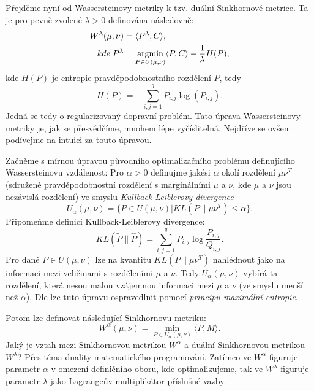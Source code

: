 \documentclass[czech]{article}
\begin{document}
Přejděme nyní od Wassersteinovy metriky k tzv. duální Sinkhornově metrice.
Ta je pro pevně zvolené $\lambda > 0$ definována následovně:
\begin{align}
    W^\lambda (\mu, \nu) &= \langle P^\lambda, C \rangle, \\
    kde \; P^\lambda &= \operatornamewithlimits{argmin}_{P \in U(\mu, \nu)} \langle P, C \rangle - \frac{1}{\lambda} H(P),
\end{align}
kde $H(P)$ je entropie pravděpodobnostního rozdělení $P$, tedy 
\begin{equation*}
    H(P) = - \sum_{i, j = 1}^q P_{i, j} \operatorname{log}(P_{i, j}).
\end{equation*}
Jedná se tedy o regularizovaný dopravní problém.
Tato úprava Wassersteinovy metriky je, jak se přesvědčíme, mnohem lépe vyčíslitelná.
Nejdříve se ovšem podívejme na intuici za touto úpravou.

Začněme s mírnou úpravou původního optimalizačního problému definujícího Wassersteinovu vzdálenost:
Pro $\alpha > 0$ definujme jakési $\alpha$ okolí rozdělení $\mu \nu^T$
(sdružené pravděpodobnostní rozdělení s marginálními $\mu$ a $\nu$, kde $\mu$ a $\nu$ jsou nezávislá rozdělení) ve smyslu
\emph{Kullback-Leiblerovy divergence}
\begin{equation}
    U_{\alpha} (\mu, \nu) = \{P \in U(\mu, \nu) | KL(P \| \mu \nu^T) \leq \alpha\}.
\end{equation}
Připomeňme definici Kullback-Leiblerovy divergence:
\begin{equation*}
    KL(\tilde{P} \| \hat{P}) = \sum_{i, j = 1}^q P_{i, j} \operatorname{log} \frac{P_{i, j}}{ Q_{i, j}}.
\end{equation*}
Pro dané $P \in U(\mu, \nu)$ lze na kvantitu $KL(P \| \mu \nu^T)$ nahlédnout jako na informaci mezi veličinami s rozděleními $\mu$ a $\nu$.
Tedy $U_\alpha (\mu, \nu)$ vybírá ta rozdělení, která nesou malou vzájemnou informaci mezi $\mu$ a $\nu$ (ve smyslu menší než $\alpha$).
Dle \cite{wass_computation} lze tuto úpravu ospravedlnit pomocí \emph{principu maximální entropie}.

Potom lze definovat následující Sinkhornovu metriku:
\begin{equation}
    W^\alpha (\mu, \nu) = \min_{P \in U_\alpha (\mu, \nu)} \langle P, M \rangle.
\end{equation}
Jaký je vztah mezi Sinkhornovou metrikou $W^\alpha$ a duální Sinkhornovou metrikou $W^\lambda$?
Přes téma duality matematického programování.
Zatímco ve $W^\alpha$ figuruje parametr $\alpha$ v omezení definičního oboru, kde optimalizujeme,
tak ve $W^\lambda$ figuruje parametr $\lambda$ jako Lagrangeův multiplikátor příslušné vazby.
\end{document}

